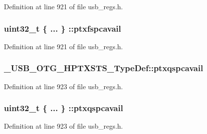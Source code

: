 Definition at line 921 of file usb\-\_\-regs.\-h.

\hypertarget{group___u_s_b___o_t_g___d_r_i_v_e_r_gacb083e7acbc0f28bd7471a6325d404e2}{
\subsubsection[{ptxfspcavail}]{\setlength{\rightskip}{0pt plus 5cm}uint32\-\_\-t \{ ... \} \-::ptxfspcavail}}\label{group___u_s_b___o_t_g___d_r_i_v_e_r_gacb083e7acbc0f28bd7471a6325d404e2}


Definition at line 921 of file usb\-\_\-regs.\-h.

\hypertarget{group___u_s_b___o_t_g___d_r_i_v_e_r_ga59b1038925aee3e4714ff80a613b03d7}{
\subsubsection[{ptxqspcavail}]{ \-\_\-\-U\-S\-B\-\_\-\-O\-T\-G\-\_\-\-H\-P\-T\-X\-S\-T\-S\-\_\-\-Type\-Def\-::ptxqspcavail}}\label{group___u_s_b___o_t_g___d_r_i_v_e_r_ga59b1038925aee3e4714ff80a613b03d7}


Definition at line 923 of file usb\-\_\-regs.\-h.

\hypertarget{group___u_s_b___o_t_g___d_r_i_v_e_r_gae8a462336fdee37fb65376aa7c10af95}{
\subsubsection[{ptxqspcavail}]{\setlength{\rightskip}{0pt plus 5cm}uint32\-\_\-t \{ ... \} \-::ptxqspcavail}}\label{group___u_s_b___o_t_g___d_r_i_v_e_r_gae8a462336fdee37fb65376aa7c10af95}


Definition at line 923 of file usb\-\_\-regs.\-h.

